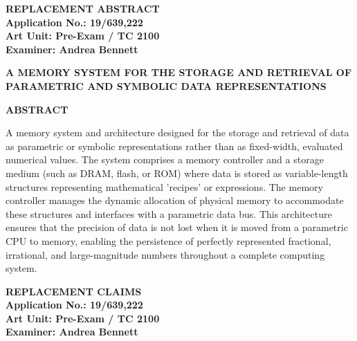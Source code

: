 \documentclass[11pt,letterpaper]{article}
\begin{document}
\thispagestyle{empty}

\begin{center}
    \textbf{\large REPLACEMENT ABSTRACT} \\
    \vspace{0.3cm}
    \textbf{Application No.: 19/639,222} \\
    \textbf{Art Unit: Pre-Exam / TC 2100} \\
    \textbf{Examiner: Andrea Bennett}
\end{center}

\vspace{0.8cm}

\begin{center}
    \textbf{A MEMORY SYSTEM FOR THE STORAGE AND RETRIEVAL OF PARAMETRIC AND SYMBOLIC DATA REPRESENTATIONS}
\end{center}

\vspace{0.5cm}

\begin{center}
    \textbf{ABSTRACT}
\end{center}

A memory system and architecture designed for the storage and retrieval of data as parametric or symbolic representations rather than as fixed-width, evaluated numerical values. The system comprises a memory controller and a storage medium (such as DRAM, flash, or ROM) where data is stored as variable-length structures representing mathematical 'recipes' or expressions. The memory controller manages the dynamic allocation of physical memory to accommodate these structures and interfaces with a parametric data bus. This architecture ensures that the precision of data is not lost when it is moved from a parametric CPU to memory, enabling the persistence of perfectly represented fractional, irrational, and large-magnitude numbers throughout a complete computing system.

\newpage

\setcounter{page}{1}
\pagestyle{plain}

\begin{center}
    \textbf{\large REPLACEMENT CLAIMS} \\
    \vspace{0.3cm}
    \textbf{Application No.: 19/639,222} \\
    \textbf{Art Unit: Pre-Exam / TC 2100} \\
    \textbf{Examiner: Andrea Bennett}
\end{center}
\end{document}

